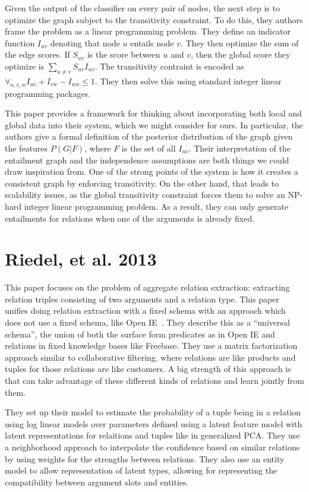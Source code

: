 \documentclass{article}
\begin{document}
Given the output of the classifier on every pair of nodes, the next step is to optimize the graph subject to the transitivity constraint. To do this, they authors frame the problem as a linear programming problem. They define an indicator function $I_{uv}$ denoting that node $u$ entails node $v$. They then optimize the sum of the edge scores. If $S_{uv}$ is the score between $u$ and $v$, then the global score they optimize is $\sum_{u \neq v} S_{uv}I_{uv}$. The transitivity contraint is encoded as $\forall_{u, v, w} I_{uv} + I_{vw} - I_{uw} \leq 1$. They then solve this using standard integer linear programming packages.

This paper provides a framework for thinking about incorporating both local and global data into their system, which we might consider for ours. In particular, the authors give a formal definition of the posterior distribution of the graph given the features $P(G|F)$, where $F$ is the set of all $I_{uv}$. Their interpretation of the entailment graph and the independence assumptions are both things we could draw inspiration from. One of the strong points of the system is how it creates a consistent graph by enforcing transitivity. On the other hand, that leads to scalability issues, as the global transitivity constraint forces them to solve an NP-hard integer linear programming problem. As a result, they can only generate entailments for relations when one of the arguments is already fixed.

\section*{Riedel, et al. 2013}

This paper focuses on the problem of aggregate relation extraction: extracting relation triples consisting of two arguments and a relation type. This paper unifies doing relation extraction with a fixed schema with an approach which does not use a fixed schema, like Open IE~\cite{Etzioni:2008:OIE:1409360.1409378}. They describe this as a ``universal schema'', the union of both the surface form predicates as in Open IE and relations in fixed knowledge bases like Freebase. They use a matrix factorization approach similar to collaborative filtering, where relations are like products and tuples for those relations are like customers. A big strength of this approach is that can take advantage of these different kinds of relations and learn jointly from them.

They set up their model to estimate the probability of a tuple being in a relation using log linear models over parameters defined using a latent feature model with latent representations for relaitions and tuples like in generalized PCA. They use a neighborhood approach to interpolate the confidence based on similar relations by using weights for the strengths between relations. They also use an entity model to allow representation of latent types, allowing for representing the compatibility between argument slots and entities.
\end{document}
